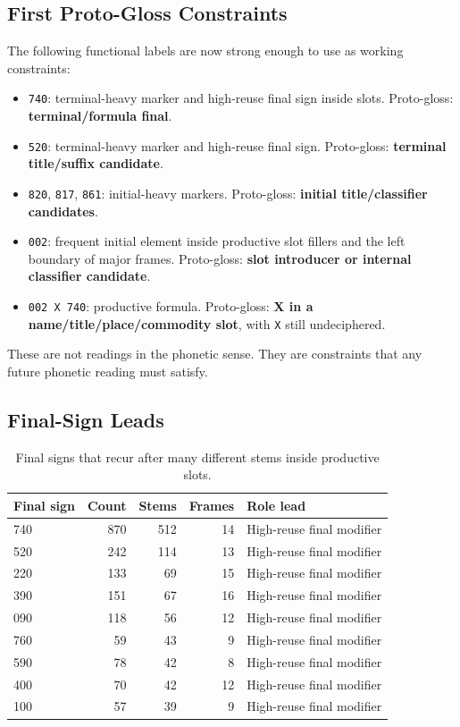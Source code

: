 \subsection{First Proto-Gloss Constraints}

The following functional labels are now strong enough to use as working constraints:

\begin{itemize}
  \item \texttt{740}: terminal-heavy marker and high-reuse final sign inside slots. Proto-gloss: \textbf{terminal/formula final}.
  \item \texttt{520}: terminal-heavy marker and high-reuse final sign. Proto-gloss: \textbf{terminal title/suffix candidate}.
  \item \texttt{820}, \texttt{817}, \texttt{861}: initial-heavy markers. Proto-gloss: \textbf{initial title/classifier candidates}.
  \item \texttt{002}: frequent initial element inside productive slot fillers and the left boundary of major frames. Proto-gloss: \textbf{slot introducer or internal classifier candidate}.
  \item \texttt{002 X 740}: productive formula. Proto-gloss: \textbf{X in a name/title/place/commodity slot}, with \texttt{X} still undeciphered.
\end{itemize}

These are not readings in the phonetic sense. They are constraints that any future phonetic reading must satisfy.

\subsection{Final-Sign Leads}

\begin{table}[htbp]
\centering
\begin{tabular}{lrrrl}
\toprule
\textbf{Final sign} & \textbf{Count} & \textbf{Stems} & \textbf{Frames} & \textbf{Role lead} \\
\midrule
740 & 870 & 512 & 14 & High-reuse final modifier \\
520 & 242 & 114 & 13 & High-reuse final modifier \\
220 & 133 & 69 & 15 & High-reuse final modifier \\
390 & 151 & 67 & 16 & High-reuse final modifier \\
090 & 118 & 56 & 12 & High-reuse final modifier \\
760 & 59 & 43 & 9 & High-reuse final modifier \\
590 & 78 & 42 & 8 & High-reuse final modifier \\
400 & 70 & 42 & 12 & High-reuse final modifier \\
100 & 57 & 39 & 9 & High-reuse final modifier \\
\bottomrule
\end{tabular}
\caption{Final signs that recur after many different stems inside productive slots.}
\label{tab:slot-final-sign-leads}
\end{table}

